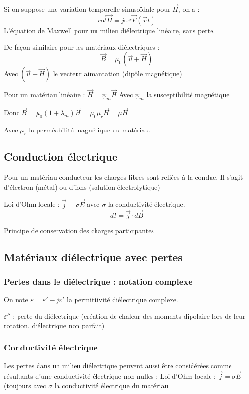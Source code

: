 \documentclass[12pt,a4paper]{report}
\begin{document}
Si on suppose une variation temporelle sinusoïdale pour \(\vec{H}\), on a :
\[
	\vec{rot} \vec{H} = j \omega \varepsilon \vec{E}(\vec{r}t)
\]
L'équation de Maxwell pour un milieu diélectrique linéaire, sans perte.

De façon similaire pour les matériaux diélectriques :
\[
	\vec{B} = \mu_0 (\vec{u} + \vec{H})
\]
Avec \((\vec{u} + \vec{H})\) le vecteur aimantation (dipôle magnétique)

Pour un matériau linéaire : \(\vec{H} = \psi_m \vec{H}\)
Avec \(\psi_m\) la susceptibilité magnétique

Donc \(\vec{B} = \mu_0 (1 + \lambda_m) \vec{H} = \mu_0 \mu_r \vec{H} = \mu \vec{H}\)

Avec \(\mu_r\) la perméabilité magnétique du matériau.

\subsection{Conduction électrique}

Pour un matériau conducteur les charges libres sont reliées à la conduc.
Il s'agit d'électron (métal) ou d'ions (solution électrolytique)

Loi d'Ohm locale : \(\vec{j} = \sigma \vec{E}\) avec \(\sigma\) la conductivité électrique.
\[
	dI = \vec{j} \cdot \vec{dB}
\]

Principe de conservation des charges participantes

\subsection{Matériaux diélectrique avec pertes}

\subsubsection{Pertes dans le diélectrique : notation complexe}

On note \(\varepsilon = \varepsilon' - j \varepsilon'\) la permittivité diélectrique complexe.

\(\varepsilon''\) : perte du diélectrique (création de chaleur des moments dipolaire lors de leur rotation, diélectrique non parfait)

\subsubsection{Conductivité électrique}

Les pertes dans un milieu diélectrique peuvent aussi être considérées comme résultants d'une conductivité électrique non nulles : Loi d'Ohm locale : \(\vec{j} = \sigma \vec{E}\) (toujours avec \(\sigma\) la conductivité électrique du matériau
\end{document}
